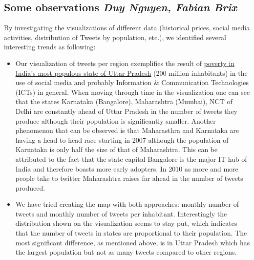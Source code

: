 \subsection*{Some observations \footnotesize\emph{Duy Nguyen, Fabian Brix}}
By investigating the visualizations of different data (historical prices, social media activities, distribution of Tweets by population, etc.), we identified several interesting trends as following:
\begin{itemize}
\item Our visualization of tweets per region exemplifies the result of \href{http://web.worldbank.org/WBSITE/EXTERNAL/TOPICS/EXTPOVERTY/EXTPA/0,,contentMDK:20208963~menuPK:435735~pagePK:148956~piPK:216618~theSitePK:430367,00.html}{poverty in India's most populous state of Uttar Pradesh} (200 million inhabitants) in the use of social media and probably Information \& Communication Technologies (ICTs) in general. When moving through time in the visualization one can see that the states Karnataka (Bangalore), Maharashtra (Mumbai), NCT of Delhi are constantly ahead of Uttar Pradesh in the number of tweets they produce although their population is significantly smaller. Another phenomenon that can be observed is that Maharasthra and Karnataka are having a head-to-head race starting in 2007 although the population of Karnataka is only half the size of that of Maharashtra. This can be attributed to the fact that the state capital Bangalore is the major IT hub of India and therefore boasts more early adopters. In 2010 as more and more people take to twitter Maharashtra raises far ahead in the number of tweets produced. 
\item We have tried creating the map with both approaches: monthly number of tweets and monthly number of tweets per inhabitant. Interestingly the distribution shown on the visualization seems to stay put, which indicates that the number of tweets in states are proportional to their population. The most significant difference, as mentioned above, is in Uttar Pradesh which has the largest population but not as many tweets compared to other regions.
\end{itemize}